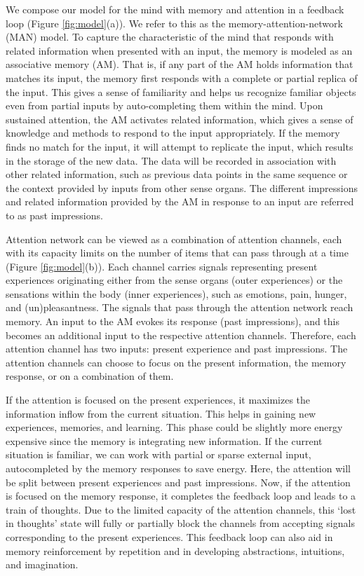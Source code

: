 \documentclass[reprint,amsmath,amssymb,apr,aip,onecolumn, 11pt]{revtex4-1}
\begin{document}
	
		We compose our model for the mind with memory and attention in a feedback loop (Figure \ref{fig:model}(a)). We refer to this as the memory-attention-network (MAN) model. To capture the characteristic of the mind that responds with related information when presented with an input, the memory is modeled as an associative memory (AM). That is, if any part of the AM holds information that matches its input, the memory first responds with a complete or partial replica of the input. This gives a sense of familiarity and helps us recognize familiar objects even from partial inputs by auto-completing them within the mind. Upon sustained attention, the AM activates related information, which gives a sense of knowledge and methods to respond to the input appropriately. If the memory finds no match for the input, it will attempt to replicate the input, which results in the storage of the new data. The data will be recorded in association with other related information, such as previous data points in the same sequence or the context provided by inputs from other sense organs. The different impressions and related information provided by the AM in response to an input are referred to as past impressions.     
%		
		
		 Attention network can be viewed as a combination of attention channels, each with its capacity limits on the number of items that can pass through at a time (Figure \ref{fig:model}(b)). Each channel carries signals representing present experiences originating either from the sense organs (outer experiences) or the sensations within the body (inner experiences), such as emotions,  pain, hunger, and (un)pleasantness. The signals that pass through the attention network reach memory. An input to the AM evokes its response (past impressions), and this becomes an additional input to the respective attention channels. Therefore, each attention channel has two inputs: present experience and past impressions. The attention channels can choose to focus on the present information, the memory response, or on a combination of them. 
		 
		 
		 If the attention is focused on the present experiences, it maximizes the information inflow from the current situation. This helps in gaining new experiences, memories, and learning. This phase could be slightly more energy expensive since the memory is integrating new information. If the current situation is familiar, we can work with partial or sparse external input, autocompleted by the memory responses to save energy. Here, the attention will be split between present experiences and past impressions.  Now, if the attention is focused on the memory response, it completes the feedback loop and leads to a train of thoughts. Due to the limited capacity of the attention channels, this `lost in thoughts' state will fully or partially block the channels from accepting signals corresponding to the present experiences. This feedback loop can also aid in memory reinforcement by repetition and in developing abstractions, intuitions, and imagination.   
\end{document}
